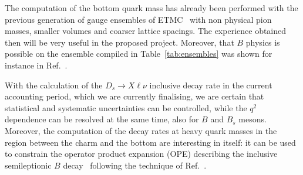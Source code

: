 The computation of the bottom quark mass has already been performed with
the previous generation of gauge ensembles of ETMC~\cite{ETM:2016nbo,ETM:2011zey} with
non physical pion masses, smaller volumes and coarser lattice
spacings.
The experience obtained then will be very useful in the proposed
project.
Moreover, that $B$ physics is possible on the ensemble compiled in
Table~\ref{tab:ensembles} was shown for instance in Ref.~\cite{Frezzotti:2024kqk}.

With the calculation of the $D_s\to X \ell \nu$ inclusive decay rate
in the current accounting period, which we are currently finalising,
we are certain that statistical and systematic uncertainties can be
controlled, while the $q^2$ dependence can be resolved at the same
time, also for $B$ and $B_s$ mesons.
Moreover, the computation of the decay rates at heavy quark masses in
the region between the charm and the bottom are interesting in itself:
it can be used to constrain the operator product expansion (OPE)
describing the inclusive semileptionic $B$
decay~\cite{Manohar:1993qn,Blok:1993va,Gambino:2004qm} following the 
technique of Ref.~\cite{Gambino:2022dvu}. 


\endinput
